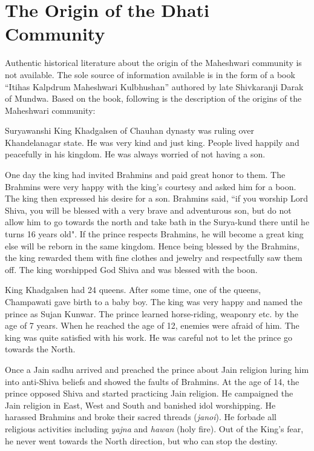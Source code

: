 \chapter{The Origin of the Dhati Community}
Authentic historical literature about the origin of the Maheshwari community is
not available. The sole source of information available is in the form of a
book ``Itihas Kalpdrum Maheshwari Kulbhushan'' authored by late Shivkaranji
Darak of Mundwa. Based on the book, following is the description of the origins
of the Maheshwari community:

Suryawanshi King Khadgalsen of Chauhan dynasty was ruling over Khandelanagar
state. He was very kind and just king. People lived happily and peacefully in
his kingdom. He was always worried of not having a son.

One day the king had invited Brahmins and paid great honor to them. The
Brahmins were very happy with the king's courtesy and asked him for a boon. The
king then expressed his desire for a son. Brahmins said, ``if you worship Lord
Shiva, you will be blessed with a very brave and adventurous son, but do not
allow him to go towards the north and take bath in the Surya-kund there until
he turns 16 years old". If the prince respects Brahmins, he will become a great
king else will be reborn in the same kingdom. Hence being blessed by the
Brahmins, the king rewarded them with fine clothes and jewelry and respectfully
saw them off. The king worshipped God Shiva and was blessed with the boon.

King Khadgalsen had 24 queens. After some time, one of the queens, Champawati
gave birth to a baby boy. The king was very happy and named the prince as Sujan
Kunwar. The prince learned horse-riding, weaponry etc. by the age of 7 years.
When he reached the age of 12, enemies were afraid of him. The king was quite
satisfied with his work. He was careful not to let the prince go towards the
North.

Once a Jain sadhu arrived and preached the prince about Jain religion luring him
into anti-Shiva beliefs and showed the faults of Brahmins. At the age of 14,
the prince opposed Shiva and started practicing Jain religion. He
campaigned the Jain religion in East, West and South and banished idol
worshipping. He harassed Brahmins and broke their sacred threads
(\textit{janoi}). He forbade all religious activities including \textit{yajna}
and \textit{hawan} (holy fire). Out of the King's fear, he never went towards
the North direction, but who can stop the destiny.

